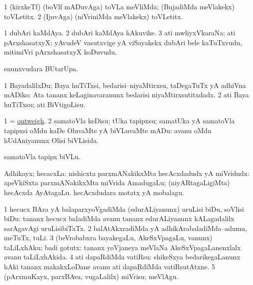\bentry
{}
\gl{\kirxvi}
\bmng
\bnum
\num{1} (kirxkeTf) (boVlf mADuvAga) toVLa meVliMda; (BujadiMda meVlakekx) toVLetitx. 
\num{2} (IjuvAga) (niVriniMda meVlakekx) toVLetitx. 
\enum
\emng
\eentry

\bentry
{}
\gl{\nA}
\bmng
\bnum
\num{1} dubAri kaMdAya. 
\num{2} dubAri kaMdAya hAkuvike. 
\num{3} ati mwliyxVkaraNa; ati pArxshasatxyX; yAvudeV vasutxvige yA viSayakekx dubAri bele kaTuTxvudu, mitimiVri pArxshasatxyX koDuvudu. 
\enum
\emng
\eentry

\bentry
{}
\gl{\kirx}
\bmng
{} enunxvudara BUtarUpa. 
\emng
\eentry

\bentry
{}
\gl{\sakirx}
\bmng
\bnum
\num{1} BayadalilxDu; Baya huTiTxsi, bedarisi--niyaMtirxsu, taDegaTuTx yA adhiVna mADiko:  Ata tananx keLaginavaranunx bedarisi niyaMtirxsutitxdadx. 
\num{2} ati Baya huTiTxsu; ati BiVtigoLisu. 
\enum
\emng
\eentry


\bentry
{}
\gl{\sakirx}
\bmng
\bnum
\num{1} = \hyperlink{outweigh}{outweigh}. 
\num{2} samatoVla keDisu; tUka tapipxsu; samatUka yA samatoVla tapipxsi oMdu kaDe OluvaMte yA biVLuvaMte mADu:  avanu oMdu hUdAniyanunx Olisi biVLisida. 
\enum
\emng

\noindent
\gl{\akirx}
\bmng
samatoVla tapipx biVLu. 
\emng
\eentry

\bentry
{}
\gl{\nA}
\bmng
Adhikayx; hecacxLa: 
\banum
{} nishicxta parxmANakikxMta hecAcxdadudx yA miVridudx:  apeVkiSxta parxmANakikxMta miVrida AmadugaLu; (niyARtagaLigiMta) hecAcxda AyAtagaLu. 
 hecAcxdudara motatx yA mobalagu. 
\eanum
\emng
\eentry

\bentry
{}
\gl{\sakirx}
\bmng
\bnum
\num{1} hecucx BAra yA balaparxyoVgadiMda (edurALiyanunx) uruLisi biDu, soVlisi biDu:  tananx hecucx baladiMda avanu tananx edurALiyanunx kALagadalilx sarAgavAgi uruLisibiTaTx. 
\num{2} balAtAkxradiMda yA adhikArabaladiMda--adumu, meTuTx, tuLi. 
\num{3} (beVrobabxra bayakegaLu, AkeSxVpagaLu, \mo vanunx) taLiLxhAku; badi gotutx:  tananx yoVjaneya meVlaNa AkeSxVpagaLanenxlalx avanu taLiLxhAkida. 
\num{4} ati dapaRdiMda vatiRsu:  shikeSxya bedarikegaLanunx hAki tananx makakxLoDane avanu ati dapaRdiMda vatiRsutAtxne. 
\num{5} (pArxmuKayx, parxBAva, \mo vugaLalilx) miVrisu; meVlAgu. 
\enum
\emng
\eentry

